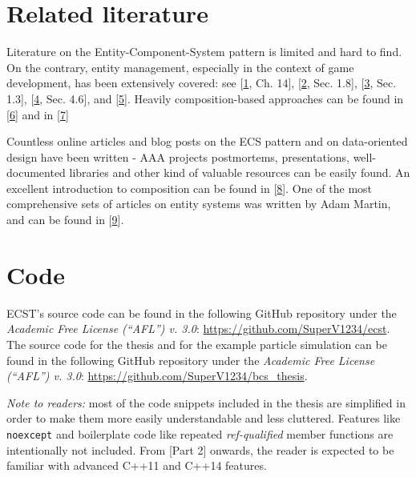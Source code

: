 \documentclass[twoside, 12pt, a4paper, openright]{book}
\begin{document}
\section{Related literature}\label{related-literature}

Literature on the Entity-Component-System pattern is limited and hard to
find. On the contrary, entity management, especially in the context of
game development, has been extensively covered: see
{[}\protect\hyperlink{ref-gregory2014game}{1}, Ch. 14{]},
{[}\protect\hyperlink{ref-game_programming_gems_4}{2}, Sec. 1.8{]},
{[}\protect\hyperlink{ref-game_programming_gems_5}{3}, Sec. 1.3{]},
{[}\protect\hyperlink{ref-game_programming_gems_6}{4}, Sec. 4.6{]}, and
{[}\protect\hyperlink{ref-doherty2003software}{5}{]}. Heavily
composition-based approaches can be found in
{[}\protect\hyperlink{ref-Wiebusch:2012}{6}{]} and in
{[}\protect\hyperlink{ref-6658092}{7}{]}

Countless online articles and blog posts on the ECS pattern and on
data-oriented design have been written - AAA projects postmortems,
presentations, well-documented libraries and other kind of valuable
resources can be easily found. An excellent introduction to composition
can be found in
{[}\protect\hyperlink{ref-robertnystorm_gpp_component}{8}{]}. One of the
most comprehensive sets of articles on entity systems was written by
Adam Martin, and can be found in
{[}\protect\hyperlink{ref-tmachine_es_category}{9}{]}.

\section{Code}\label{code}

ECST's source code can be found in the following GitHub repository under
the \emph{Academic Free License (``AFL'') v. 3.0}:
\url{https://github.com/SuperV1234/ecst}. The source code for the thesis
and for the example particle simulation can be found in the following
GitHub repository under the \emph{Academic Free License (``AFL'') v.
3.0}: \url{https://github.com/SuperV1234/bcs_thesis}.

\emph{Note to readers:} most of the code snippets included in the thesis
are simplified in order to make them more easily understandable and less
cluttered. Features like
\texttt{noexcept}
and boilerplate code like repeated \emph{ref-qualified} member functions
are intentionally not included. From {[}Part 2{]} onwards, the reader is
expected to be familiar with advanced C++11 and C++14 features.
\end{document}
